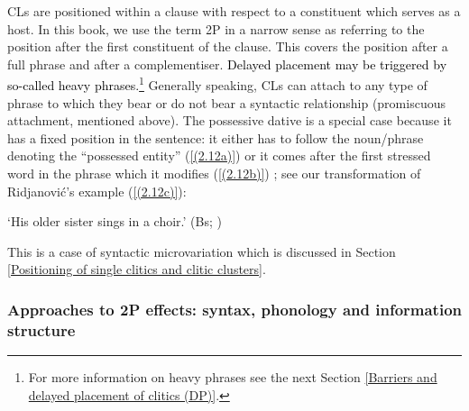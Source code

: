 CLs are positioned within a clause with respect to a constituent which serves as a host. In this book, we use the term 2P in a narrow sense as referring to the position after the first constituent of the clause. This covers the position after a full phrase and after a complementiser. \textcolor{black}{Delayed placement may be triggered by so-called heavy phrases.}\footnote{For more information on heavy phrases see the next Section \ref{Barriers and delayed placement of clitics (DP)}.} Generally speaking, CLs can attach to any type of phrase to which they bear or do not bear a syntactic relationship (promiscuous attachment, mentioned above). The possessive dative is a special case because it has a fixed position in the sentence: it either has to follow the noun/phrase denoting the ``possessed entity'' (\ref{(2.12a)}) or it comes after the first stressed word in the phrase which it modifies (\ref{(2.12b)}) \citep[cf.][559]{Ridjanovic12}; see our transformation of Ridjanović’s example (\ref{(2.12c)}):

\begin{exe}\ex
\begin{xlist}
\end{xlist}
\glt ‘His older sister sings in a choir.’ 
\hfill (Bs; \citealt[559]{Ridjanovic12})
\end{exe}

\noindent This is a case of syntactic microvariation which is discussed in Section \ref{Positioning of single clitics and clitic clusters}.

\subsubsection{Approaches to 2P effects: syntax, phonology and information structure}
\label{Approaches to 2P effects: syntax, phonology and information structure}
\label{Barrier-template theory}

